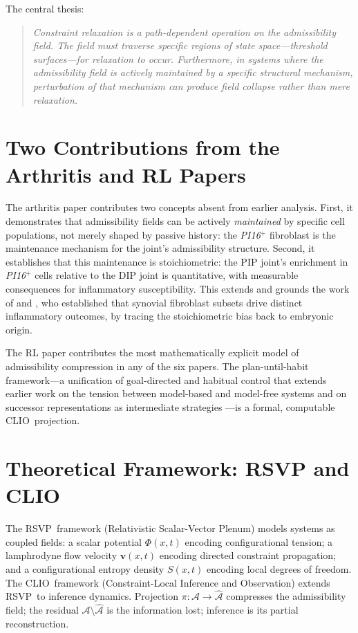 \documentclass[12pt, a4paper, twoside]{book}
\theoremstyle{definition}
\theoremstyle{remark}
\newcommand{\Adm}{\mathcal{A}}
\newcommand{\vv}{\mathbf{v}}
\newcommand{\RSVP}{\textsf{RSVP}}
\newcommand{\CLIO}{\textsf{CLIO}}
\newcommand{\gene}[1]{\textit{#1}}
\begin{document}
The central thesis:
\begin{quote}\itshape
Constraint relaxation is a path-dependent operation on the admissibility field. The field must traverse specific regions of state space---threshold surfaces---for relaxation to occur. Furthermore, in systems where the admissibility field is actively maintained by a specific structural mechanism, perturbation of that mechanism can produce field collapse rather than mere relaxation.
\end{quote}

\section{Two Contributions from the Arthritis and RL Papers}

The arthritis paper \citep{davidson2026} contributes two concepts absent from earlier analysis. First, it demonstrates that admissibility fields can be actively \emph{maintained} by specific cell populations, not merely shaped by passive history: the \gene{PI16}$^+$ fibroblast is the maintenance mechanism for the joint's admissibility structure. Second, it establishes that this maintenance is stoichiometric: the PIP joint's enrichment in \gene{PI16}$^+$ cells relative to the DIP joint is quantitative, with measurable consequences for inflammatory susceptibility. This extends and grounds the work of \citet{croft2019} and \citet{zhang2019}, who established that synovial fibroblast subsets drive distinct inflammatory outcomes, by tracing the stoichiometric bias back to embryonic origin.

The RL paper \citep{okitsu2026} contributes the most mathematically explicit model of admissibility compression in any of the six papers. The plan-until-habit framework---a unification of goal-directed and habitual control that extends earlier work on the tension between model-based and model-free systems \citep{dayanballeine2002, keramati2011, dezfouli2014} and on successor representations as intermediate strategies \citep{momennejad2017, gershman2017}---is a formal, computable \CLIO\ projection.

\section{Theoretical Framework: RSVP and CLIO}

The \RSVP\ framework (Relativistic Scalar-Vector Plenum) models systems as coupled fields: a scalar potential $\Phi(x,t)$ encoding configurational tension; a lamphrodyne flow velocity $\vv(x,t)$ encoding directed constraint propagation; and a configurational entropy density $S(x,t)$ encoding local degrees of freedom. The \CLIO\ framework (Constraint-Local Inference and Observation) extends \RSVP\ to inference dynamics. Projection $\pi: \Adm \to \hat{\Adm}$ compresses the admissibility field; the residual $\Adm \setminus \hat{\Adm}$ is the information lost; inference is its partial reconstruction.
\end{document}
